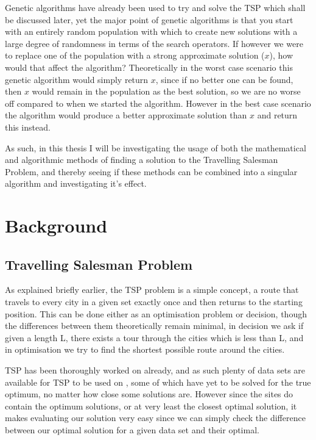 \documentclass[11pt,a4paper,titlepage]{article}
\begin{document}
Genetic algorithms have already been used to try and solve the TSP which shall be discussed later, yet the major point of genetic algorithms is that you start with an entirely random population with which to create new solutions with a large degree of randomness in terms of the search operators. If however we were to replace one of the population with a strong approximate solution ($x$), how would that affect the algorithm? Theoretically in the worst case scenario this genetic algorithm would simply return $x$, since if no better one can be found, then $x$ would remain in the population as the best solution, so we are no worse off compared to when we started the algorithm. However in the best case scenario the algorithm would produce a better approximate solution than $x$ and return this instead.

As such, in this thesis I will be investigating the usage of both the mathematical and algorithmic methods of finding a solution to the Travelling Salesman Problem, and thereby seeing if these methods can be combined into a singular algorithm and investigating it's effect.


\section{Background}

\subsection{Travelling Salesman Problem}
As explained briefly earlier, the TSP problem is a simple concept, a route that travels to every city in a given set exactly once and then returns to the starting position. This can be done either as an optimisation problem or decision, though the differences between them theoretically remain minimal, in decision we ask if given a length L, there exists a tour through the cities which is less than L, and in optimisation we try to find the shortest possible route around the cities.

TSP has been thoroughly worked on already, and as such plenty of data sets are available for TSP to be used on \cite{TSPRep1, TSPRep2}, some of which have yet to be solved for the true optimum, no matter how close some solutions are. However since the sites do contain the optimum solutions, or at very least the closest optimal solution, it makes evaluating our solution very easy since we can simply check the difference between our optimal solution for a given data set and their optimal.
\end{document}
